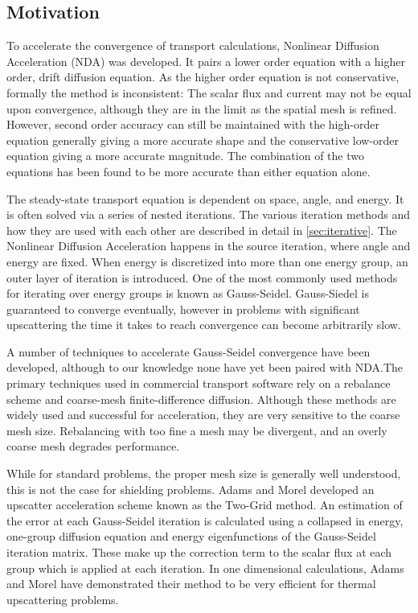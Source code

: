\subsection{Motivation}
To accelerate the convergence of transport calculations, Nonlinear Diffusion Acceleration (NDA) was developed. It pairs a lower order equation with a higher order, drift diffusion equation. As the higher order equation is not conservative, formally the method is inconsistent: The scalar flux and current may not be equal upon convergence, although they are in the limit as the spatial mesh is refined. However, second order accuracy can still be maintained with the high-order equation generally giving a more accurate shape and the conservative low-order equation giving a more accurate magnitude. The combination of the two equations has been found to be more accurate than either equation alone. \cite{morel-holo} \par
The steady-state transport equation is dependent on space, angle, and energy. It is often solved via a series of nested iterations. The various iteration methods and how they are used with each other are described in detail in \ref{sec:iterative}. The Nonlinear Diffusion Acceleration happens in the source iteration, where angle and energy are fixed. When energy is discretized into more than one energy group, an outer layer of iteration is introduced. One of the most commonly used methods for iterating over energy groups is known as Gauss-Seidel. Gauss-Siedel is guaranteed to converge eventually, however in problems with significant upscattering the time it takes to reach convergence can become arbitrarily slow. 
\par
A number of techniques to accelerate Gauss-Seidel convergence have been developed, although to our knowledge none have yet been paired with NDA.The primary techniques used in commercial transport software rely on a rebalance scheme and coarse-mesh finite-difference diffusion. Although these methods are widely used and successful for acceleration, they are very sensitive to the coarse mesh size. Rebalancing with too fine a mesh may be divergent, and an overly coarse mesh degrades performance. \cite{evans-upscat}
\par
While for standard problems, the proper mesh size is generally well understood, this is not the case for shielding problems. Adams and Morel developed an upscatter acceleration scheme known as the Two-Grid method. An estimation of the error at each Gauss-Seidel iteration is calculated using a collapsed in energy, one-group diffusion equation and energy eigenfunctions of the Gauss-Seidel iteration matrix. These make up the correction term to the scalar flux at each group which is applied at each iteration. In one dimensional calculations, Adams and Morel have demonstrated their method to be very efficient for thermal upscattering problems. \cite{morel-upscat}

